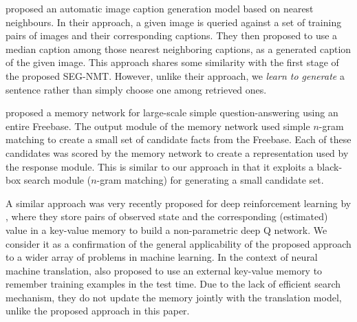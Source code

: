 
\cite{devlin2015exploring} proposed an automatic image caption generation model based on nearest neighbours. In their approach, a given image is queried against a set of training pairs of images and their corresponding captions. They then proposed to use a median caption among those nearest neighboring captions, as a generated caption of the given image. This approach shares some similarity with the first stage of the proposed SEG-NMT. However, unlike their approach, we {\it learn to generate} a sentence rather than simply choose one among retrieved ones. 


\cite{bordes2015large} proposed a memory network for large-scale simple question-answering using an entire Freebase\citep{bollacker2008freebase}. The output module of the memory network used simple $n$-gram matching to create a small set of candidate facts from the Freebase. Each of these candidates was scored by the memory network to create a representation used by the response module. This is similar to our approach in that it exploits a black-box search module ($n$-gram matching) for generating a small candidate set. 


A similar approach was very recently proposed for deep reinforcement learning by \cite{pritzel2017neural}, where they store pairs of observed state and the corresponding (estimated) value in a key-value memory to build a non-parametric deep Q network. We consider it as a confirmation of the general applicability of the proposed approach to a wider array of problems in machine learning.
In the context of neural machine translation, \cite{kaiser2017learning} also proposed to use an external key-value memory to remember training examples in the test time. Due to the lack of efficient search mechanism, they do not update the memory jointly with the translation model, unlike the proposed approach in this paper.

